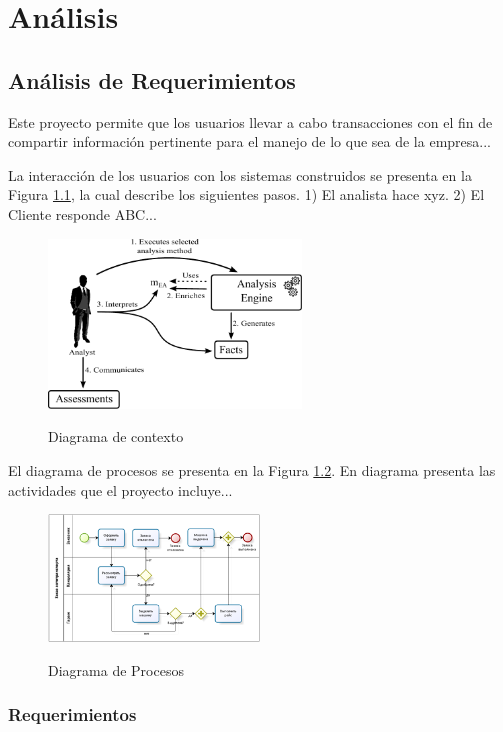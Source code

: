 \chapter{Análisis}
\section{Análisis de Requerimientos}
Este proyecto permite que los usuarios llevar a cabo transacciones con el fin de compartir información pertinente para el manejo de lo que sea de la empresa...

La interacción de los usuarios con los sistemas construidos se presenta en la Figura \ref{fig:Analisis}, la cual describe los siguientes pasos. 1) El analista hace xyz. 2) El Cliente responde ABC...

\begin{figure}[ht] 
\centering
\caption{Diagrama de contexto}
\includegraphics[width=0.6\textwidth]{img/analisis.pdf}
\label{fig:Analisis}  
\end{figure} 

El diagrama de procesos se presenta en la Figura \ref{fig:Diagrama-de-Procesos}. En diagrama presenta las actividades que el proyecto incluye...

\begin{figure}[ht] 
\centering
\caption{Diagrama de Procesos}
\includegraphics[width=0.5\textwidth]{img/bpmn.png}
\label{fig:Diagrama-de-Procesos}  
\end{figure} 

\subsection{Requerimientos}

